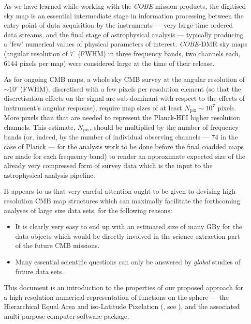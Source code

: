 \documentclass[12pt,twoside]{article}
\newcommand{\npix}{N_{\mathrm{pix}}}
\begin{document}
As we have learned while working with the {\it COBE} mission products, 
the digitised
sky map is an essential intermediate 
stage in information processing between 
the entry point of data acquisition by the 
instruments --- very large time ordered data streams,
and the final stage of astrophysical analysis --- 
typically producing a 
'few'
 numerical values
of physical parameters of interest. 
{\it COBE}-DMR sky maps (angular resolution of $7^\circ$ (FWHM) in
three frequency bands, two channels each, 6144 pixels per map)
were considered large at the time of their release.

As for ongoing CMB maps, a whole sky CMB survey  
at the angular resolution
of $\sim 10'$ (FWHM), discretised with 
a few pixels per resolution element 
(so that the discretisation effects on the signal are  
sub-dominant with respect to the effects of instrument's angular response),
require map sizes of at least 
$\npix \sim  10^7$ pixels.
More pixels than that are needed to represent the Planck-HFI higher 
resolution channels.
This estimate, $\npix$, should be multiplied by  the number of frequency bands 
(or, indeed, by the number of individual
observing channels --- 74 in the case of Planck --- for the analysis work 
to be done before the
final coadded maps are made for each frequency band) to render 
an approximate expected
size of the already very compressed form of survey data which is
the input to the astrophysical analysis pipeline. 

It appears to us that very careful
attention ought to be given to devising  high resolution CMB map
structures which can maximally facilitate 
the forthcoming analyses of large size data sets, for the following
reasons:
\begin{itemize}
\item It is clearly very easy to end up with an estimated size of many GBy 
for the 
data objects which would be directly involved in the science extraction
part of the future CMB missions.
\item Many essential scientific questions
can only be answered by {\em global} studies of  future data sets.
\end{itemize}

This document is an introduction to the
properties of our proposed approach for a high resolution numerical
representation of  functions on the sphere
 --- the Hierarchical
Equal Area and iso-Latitude Pixelation  (\healpixns, see 
\htmladdnormallink{\texttt{\healpixwebpage}}
{\healpixwebpage}), 
and the associated multi-purpose computer 
software package. 
 
\end{document}
